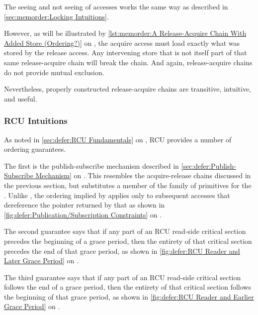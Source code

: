 The seeing and not seeing of accesses works the same way as described in
\cref{sec:memorder:Locking Intuitions}.

However, as will be illustrated by
\cref{lst:memorder:A Release-Acquire Chain With Added Store (Ordering?)}
on
,
the acquire access must load exactly what was stored by the release access.
Any intervening store that is not itself part of that same release-acquire
chain will break the chain.
And again, release-acquire chains do not provide mutual exclusion.

Nevertheless, properly constructed release-acquire chains are transitive,
intuitive, and useful.

\subsubsection{RCU Intuitions}
\label{sec:memorder:RCU Intuitions}

As noted in \cref{sec:defer:RCU Fundamentals} on
, RCU provides a number
of ordering guarantees.

The first is the publish-subscribe mechanism described in
\cref{sec:defer:Publish-Subscribe Mechanism}
on
.
This resembles the acquire-release chains discussed in the previous
section, but substitutes a member of the  family
of primitives for the .
Unlike , the ordering implied by
 applies only to subsequent accesses that
dereference the pointer returned by that 
as shown in
\cref{fig:defer:Publication/Subscription Constraints}
on
.

The second guarantee says that if any part of an RCU read-side
critical section precedes the beginning of a grace period, then
the entirety of that critical section precedes the end of that
grace period, as shown in
\cref{fig:defer:RCU Reader and Later Grace Period}
on
.

The third guarantee says that if any part of an RCU read-side critical
section follows the end of a grace period, then the entirety of that
critical section follows the beginning of that grace period, as shown in
\cref{fig:defer:RCU Reader and Earlier Grace Period}
on
.

